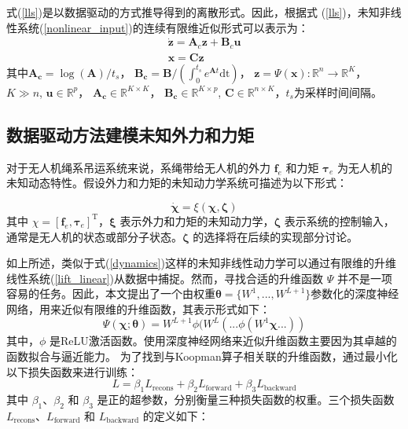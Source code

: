 \documentclass[lang=chs, degree=master, blindreview=true, winfonts=true]{yanputhesis}
\begin{document}
式(\ref{lls})是以数据驱动的方式推导得到的离散形式。因此，根据式 (\ref{lls})，未知非线性系统(\ref{nonlinear_input})的连续有限维近似形式可以表示为：
\begin{equation}
	\begin{gathered}\dot{\boldsymbol{z}}=\boldsymbol{A}_{c}\boldsymbol{z}+\boldsymbol{B}_{c}\boldsymbol{u}\\\boldsymbol{x}=\boldsymbol{C}\boldsymbol{z}\end{gathered}
	\label{lift_linear}
\end{equation}
其中$\bm{A_c}=\log(\bm{A})/t_s$， $\bm{B_c}=\bm{B}/(\int_{0}^{t_s}e^{\bm{A}t}\text{dt})$， $\bm{z} = {\Psi}(\bm{x}):\mathbb{R}^n \rightarrow \mathbb{R}^K$， $K\gg n$, $\bm{u}\in \mathbb{R}^p$， $\bm{A_c} \in \mathbb{R}^{K\times K}$，  $\bm{B_c} \in \mathbb{R}^{K\times p}$, $\bm{C} \in \mathbb{R}^{n\times K}$，$t_s$为采样时间间隔。


\subsection{数据驱动方法建模未知外力和力矩}
对于无人机绳系吊运系统来说，系绳带给无人机的外力 $\bm{f}_e$ 和力矩 $\bm{\tau}_e$ 为无人机的未知动态特性。假设外力和力矩的未知动力学系统可描述为以下形式：

\begin{equation}
	\dot{\bm \chi} = {\xi}(\bm \chi,\bm \zeta) \label{dynamics}
\end{equation}
其中 $\chi = [ \bm f_e, \bm \tau_e]^\mathrm{T}$，$\bm{\xi}$ 表示外力和力矩的未知动力学，$\bm{\zeta}$ 表示系统的控制输入，通常是无人机的状态或部分子状态。$\bm{\zeta}$ 的选择将在后续的实现部分讨论。

如上所述，类似于式(\ref{dynamics})这样的未知非线性动力学可以通过有限维的升维线性系统(\ref{lift_linear})从数据中捕捉。然而，寻找合适的升维函数 ${\Psi}$ 并不是一项容易的任务。因此，本文提出了一个由权重$\bm{\theta} = \{W^1, ..., W^{L+1}\}$参数化的深度神经网络，用来近似有限维的升维函数，其表示形式如下：
\begin{equation}
	{\Psi}(\bm \chi;\bm{\theta}) = W^{L+1}\phi(W^L(...\phi(W^1 \bm \chi...)) \label{dnn}
\end{equation}
其中，$\phi$ 是ReLU激活函数。使用深度神经网络来近似升维函数主要因为其卓越的函数拟合与逼近能力。
为了找到与Koopman算子相关联的升维函数，通过最小化以下损失函数来进行训练：
\begin{equation}
	L = \beta_1 L_{\text{recons}} + \beta_2 L_{\text{forward}} + \beta_3 L_{\text{backward}}
\end{equation}
其中 $\beta_1$、$\beta_2$ 和 $\beta_3$ 是正的超参数，分别衡量三种损失函数的权重。三个损失函数 $L_{\text{recons}}$、$L_{\text{forward}}$ 和 $L_{\text{backward}}$ 的定义如下：
\end{document}
